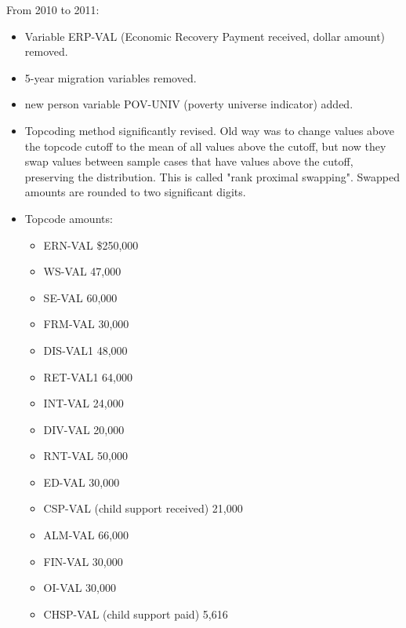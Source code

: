\documentclass{article}
\begin{document}
From 2010 to 2011:
\begin{itemize}
	\item Variable ERP-VAL (Economic Recovery Payment received, dollar amount) removed.
	\item 5-year migration variables removed.
	\item new person variable POV-UNIV (poverty universe indicator) added.
	\item Topcoding method significantly revised. Old way was to change values above the topcode cutoff to the mean of all values above the cutoff, but now they swap values between sample cases that have values above the cutoff, preserving the distribution. This is called "rank proximal swapping". Swapped amounts are rounded to two significant digits.
	\item Topcode amounts:
	\begin{itemize}
		\item ERN-VAL \$250,000
		\item WS-VAL 47,000
		\item SE-VAL 60,000
		\item FRM-VAL 30,000
		\item DIS-VAL1 48,000
		\item RET-VAL1 64,000
		\item INT-VAL 24,000
		\item DIV-VAL 20,000
		\item RNT-VAL 50,000
		\item ED-VAL 30,000
		\item CSP-VAL (child support received) 21,000
		\item ALM-VAL 66,000
		\item FIN-VAL 30,000
		\item OI-VAL 30,000
		\item CHSP-VAL (child support paid) 5,616
	\end{itemize}
\end{itemize}
\end{document}

